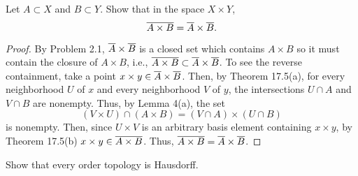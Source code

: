 \newpage
\begin{problem}[Munkres \S17, p.\,101, 9]
Let $A\subset X$ and $B\subset Y$. Show that in the space
$X\times Y$,
\[
\overline{A\times B}=\overline{A}\times\overline{B}.
\]
\end{problem}
\begin{proof}
By Problem 2.1, $\overline{A}\times\overline{B}$ is a closed set which
contains $A\times B$ so it must contain the closure of $A\times
B$, i.e., $\overline{A\times B}\subset\overline{A}\times\overline{B}$. To see the
reverse containment, take a point $x\times y\in\overline{A}\times\overline{B}$. Then, by Theorem 17.5(a), for every neighborhood $U$ of $x$
and every neighborhood $V$ of $y$, the intersections $U\cap A$
and $V\cap B$ are nonempty. Thus, by Lemma 4(a), the set
\[
(V\times U)\cap(A\times B)=(V\cap A)\times (U\cap B)
\]
is nonempty. Then, since $U\times V$ is an arbitrary basis
element containing $x\times y$, by Theorem 17.5(b) $x\times
y\in\overline{A\times B}$. Thus, $\overline{A\times B}=\overline{A}\times\overline{B}$.
\end{proof}
\newpage
\begin{problem}[Munkres \S17, p.\,101, 10]
Show that every order topology is Hausdorff.
\end{problem}
